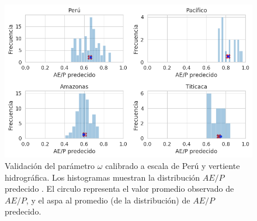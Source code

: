\begin{figure}[htb]
	\includegraphics[scale=.75]{Images/09_proBK_val.png}
	\centering
	\caption{Validación del parámetro $\omega$ calibrado a escala de Perú y vertiente hidrográfica. Los histogramas muestran la distribución $AE/P$ predecido . El circulo representa el valor promedio observado de $AE/P$, y el aspa al promedio (de la distribución) de $AE/P$ predecido.}
	\label{fig:09_proBK_val}
\end{figure}
